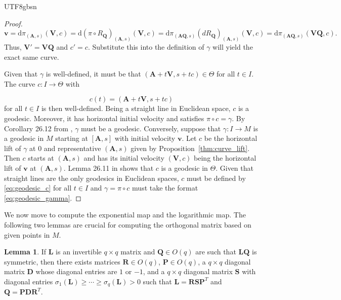 \documentclass[12pt]{report}
\theoremstyle{plain}
\theoremstyle{definition}
\newtheorem{lemma}[theorem]{Lemma}
\begin{document}
\begin{CJK*}{UTF8}{gbsn}
\begin{proof}
\begin{equation*}
  \bm{v} = \mathrm{d}\pi_{(\bm{A},s)} (\bm{V},c) = \mathrm{d}(\pi \circ R_{\bm{Q}})_{(\bm{A},s)} (\bm{V},c)
  = \mathrm{d} \pi_{(\bm{A}\bm{Q},s)} (dR_{\bm{Q}})_{(\bm{A},s)}(\bm{V},c)
  = \mathrm{d} \pi_{(\bm{A}\bm{Q},s)} (\bm{V}\bm{Q},c).
\end{equation*}
Thus, $\bm{V}' = \bm{V}\bm{Q}$ and $c'=c$.
Substitute this into the definition of $\gamma$ 
will yield the exact same curve.

Given that $\gamma$ is well-defined, 
it must be that $(\bm{A} + t\bm{V}, s + tc) \in \Theta$ for all $t \in I$.
The curve $c:I \to \Theta$
with 

\begin{equation}\label{eq:geodesic_c}
  c(t) = (\bm{A} + t\bm{V}, s + tc)
\end{equation}
for all $t \in I$
is then well-defined. Being a straight line 
in Euclidean space, $c$ is a geodesic.
Moreover, it has horizontal initial velocity and satisfies 
$\pi \circ c = \gamma$. 
By Corollary 26.12 from \citealp{Michor_2008},
$\gamma$ must be a geodesic.
Conversely, suppose that $\gamma: I \to M$ is a geodesic in $M$
starting at
$[\bm{A},s]$ with initial velocity 
$\bm{v}$. 
Let $c$ be the horizontal lift of $\gamma$  at $0$ and representative 
$ (\bm{A},s)$
given by Proposition~\ref{thm:curve_lift}.
Then $c$ starts at $ (\bm{A},s)$ and has its initial velocity 
$(\bm{V},c)$ being the horizontal lift of $\bm{v}$ at $ (\bm{A},s)$.
Lemma 26.11 in \citealp{Michor_2008}
shows that $c$ is a geodesic in $\Theta$.
Given that straight lines are the only geodesics in Euclidean spaces,
$c$ must be defined by \eqref{eq:geodesic_c} for all $t \in I$
and $\gamma = \pi \circ c$ must take the format \eqref{eq:geodesic_gamma}.
\end{proof}

We now move to compute the exponential map 
and the logarithmic map.
The following two lemmas are crucial 
for computing the orthogonal matrix based on given points in $M$.

\begin{lemma}\label{thm:q_classification}
If $\bm{L}$ is an invertible $q \times q$ matrix
and $\bm{Q} \in O(q)$ are such that $\bm{L}\bm{Q}$ is symmetric,
then there exists matrices $\bm{R}\in O(q)$, $\bm{P} \in O(q)$, 
a $q \times q$ diagonal matrix $\bm{D}$ whose diagonal entries are $1$ or $-1$,
and a $q \times q$ diagonal matrix $\bm{S}$ with diagonal entries 
$\sigma_1(\bm{L}) \geqslant \cdots \geqslant \sigma_q(\bm{L})>0$
such that $\bm{L} = \bm{R}\bm{S}\bm{P}^T$
and $\bm{Q} = \bm{P}\bm{D}\bm{R}^T$.


\end{lemma}
\end{CJK*}
\end{document}
